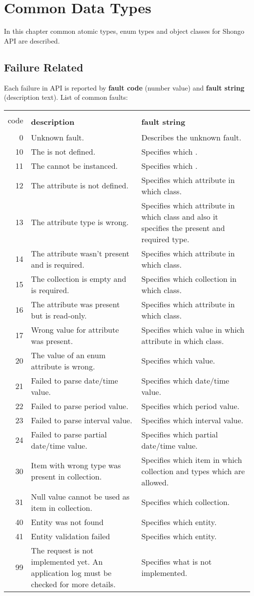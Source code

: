 \chapter{Common Data Types}



In this chapter common atomic types, enum types and object classes for Shongo API are described.

\section{Failure Related}

Each failure in API is reported by \textbf{fault code} (number value) and \textbf{fault string} (description text). List of common faults:

\newcommand{\fault}[3]{#1 & #2 & #3 \\ \hline}
\begin{longtable}{|r|p{5cm}|p{7.5cm}|}
\hline
\textbf{\multirow{2}{*}{\centering\begin{minipage}{8mm}fault \\ \hspace*{0.5mm}code\end{minipage}}} & \multirow{2}{*}{\textbf{description}} & \multirow{2}{*}{\textbf{fault string}} \\ 
 & & \\ \hline 
\fault{0}{Unknown fault.}{Describes the unknown fault.}
\fault{10}{The \ApiValue{class} is not defined.}{Specifies which \ApiValue{class}.}
\fault{11}{The \ApiValue{class} cannot be instanced.}{Specifies which \ApiValue{class}.}
\fault{12}{The attribute is not defined.}{Specifies which attribute in which class.}
\fault{13}{The attribute type is wrong.}{Specifies which attribute in which class and also it specifies the present and required type.}
\fault{14}{The attribute wasn't present and is required.}{Specifies which attribute in which class.}
\fault{15}{The collection is empty and is required.}{Specifies which collection in which class.}
\fault{16}{The attribute was present but is read-only.}{Specifies which attribute in which class.}
\fault{17}{Wrong value for attribute was present.}{Specifies which value in which attribute in which class.}
\fault{20}{The value of an enum attribute is wrong.}{Specifies which value.}
\fault{21}{Failed to parse date/time value.}{Specifies which date/time value.}
\fault{22}{Failed to parse period value.}{Specifies which period value.}
\fault{23}{Failed to parse interval value.}{Specifies which interval value.}
\fault{24}{Failed to parse partial date/time value.}{Specifies which partial date/time value.}
\fault{30}{Item with wrong type was present in collection.}{Specifies which item in which collection and types which are allowed.}
\fault{31}{Null value cannot be used as item in collection.}{Specifies which collection.}
\fault{40}{Entity was not found}{Specifies which entity.}
\fault{41}{Entity validation failed}{Specifies which entity.}
\fault{99}{The request is not implemented yet. An application log must be checked for more details.}{Specifies what is not implemented.}
\end{longtable}

